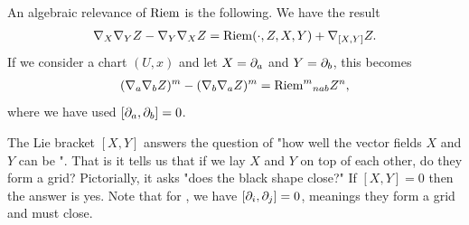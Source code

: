 \documentclass[12pt]{article} %
\begin{document}
\begin{lema}
 An algebraic relevance of $\mathrm{Riem}$ is the following. We have the result 
\begin{align*}
    \nabla_X\nabla_YZ - \nabla_Y\nabla_X Z = \mathrm{Riem}(\cdot, Z,X,Y) + \nabla_{[X,Y]}Z.
\end{align*}
If we consider a chart $(U,x)$ and let $X=\partial_a$ and $Y=\partial_b$, this becomes 
\begin{align*}
    (\nabla_a\nabla_bZ)^m - (\nabla_b\nabla_aZ)^m = {\mathrm{Riem}^m}_{nab}Z^n,
\end{align*}
where we have used $[\partial_a,\partial_b]=0$.   
\end{lema}



\bcl \label{re:iqnne}
    The Lie bracket $[X,Y]$ answers the question of "how well the vector fields $X$ and $Y$ can be ". That is it tells us that if we lay $X$ and $Y$ on top of each other, do they form a grid? Pictorially, it asks "does the black shape close?" If $[X,Y]=0$ then the answer is yes. Note that for , we have $[\partial_i,\partial_j]=0$, meanings  they form a grid and  must close. 
\end{document}
